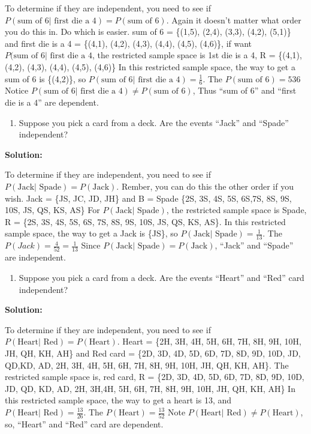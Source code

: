 \documentclass[]{book}
\providecommand{\tightlist}{%
  \setlength{\itemsep}{0pt}\setlength{\parskip}{0pt}}
\begin{document}
To determine if they are independent, you need to see if \(P(\text{sum of 6| first die a 4})=P(\text{sum of 6})\). Again it doesn't matter what order you do this in. Do which is easier.
sum of 6 = \{(1,5), (2,4), (3,3), (4,2), (5,1)\} and
first die is a 4 = \{(4,1), (4,2), (4,3), (4,4), (4,5), (4,6)\}, if want \(P(\text{sum of 6| first die a 4}\), the restricted sample space is 1st die is a 4, R = \{(4,1), (4,2), (4,3), (4,4), (4,5), (4,6)\}
In this restricted sample space, the way to get a sum of 6 is \{(4,2)\},
so \(P(\text{sum of 6| first die a 4})=\frac{1}{6}\).
The \(P(\text{sum of 6})={5}{36}\)
Notice \(P(\text{sum of 6| first die a 4})\ne P(\text{sum of 6})\), Thus ``sum of 6'' and ``first die is a 4'' are dependent.

\begin{enumerate}
\def\labelenumi{\alph{enumi}.}
\setcounter{enumi}{2}
\tightlist
\item
  Suppose you pick a card from a deck. Are the events ``Jack'' and
  ``Spade'' independent?
\end{enumerate}

\textbf{Solution:}

To determine if they are independent, you need to see if \(P(\text{Jack| Spade})=P(\text{Jack})\). Rember, you can do this the other order if you wish.
Jack = \{JS, JC, JD, JH\} and B = Spade \{2S, 3S, 4S, 5S, 6S,7S, 8S, 9S, 10S, JS, QS, KS, AS\}
For \(P(\text{Jack| Spade})\), the restricted sample space is Spade, R = \{2S, 3S, 4S, 5S, 6S, 7S, 8S, 9S, 10S, JS, QS, KS, AS\}. In this restricted sample space, the way to get a Jack is \{JS\}, so \(P(\text{Jack| Spade})=\frac{1}{13}\).
The \(P(Jack)=\frac{4}{52}=\frac{1}{13}\)
Since \(P(\text{Jack| Spade})=P(\text{Jack})\), ``Jack'' and ``Spade'' are independent.

\begin{enumerate}
\def\labelenumi{\alph{enumi}.}
\setcounter{enumi}{3}
\tightlist
\item
  Suppose you pick a card from a deck. Are the events ``Heart'' and
  ``Red'' card independent?
\end{enumerate}

\textbf{Solution:}

To determine if they are independent, you need to see if \(P(\text{Heart| Red})=P(\text{Heart})\).
Heart = \{2H, 3H, 4H, 5H, 6H, 7H, 8H, 9H, 10H, JH, QH, KH, AH\} and
Red card = \{2D, 3D, 4D, 5D, 6D, 7D, 8D, 9D, 10D, JD, QD,KD, AD, 2H, 3H, 4H, 5H, 6H, 7H, 8H, 9H, 10H, JH, QH, KH, AH\}.
The restricted sample space is, red card, R = \{2D, 3D, 4D, 5D, 6D, 7D, 8D, 9D, 10D, JD, QD, KD, AD, 2H, 3H,4H, 5H, 6H, 7H, 8H, 9H, 10H, JH, QH, KH, AH\}
In this restricted sample space, the way to get a heart is 13, and
\(P(\text{Heart| Red})=\frac{13}{26}\).
The \(P(\text{Heart})=\frac{13}{52}\)
Note \(P(\text{Heart| Red})\ne P(\text{Heart})\), so, ``Heart'' and ``Red'' card are dependent.
\end{document}
